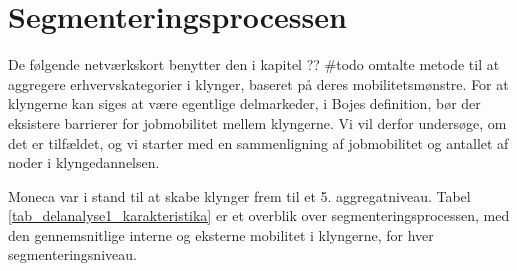 
%  
% 


\section{Segmenteringsprocessen \label{delanalyse1_segmenteringsprocessen}}

De følgende netværkskort benytter den i kapitel ?? \#todo omtalte metode til at aggregere erhvervskategorier i klynger, baseret på deres mobilitetsmønstre. For at klyngerne kan siges at være egentlige delmarkeder, i Bojes definition, bør der eksistere barrierer for jobmobilitet mellem klyngerne. Vi vil derfor undersøge, om det er tilfældet, og vi starter med en sammenligning af jobmobilitet og antallet af noder i klyngedannelsen. 

Moneca var i stand til at skabe klynger frem til et 5. aggregatniveau. Tabel \ref{tab_delanalyse1_karakteristika}  er et overblik over segmenteringsprocessen, med den gennemsnitlige interne og eksterne mobilitet i klyngerne, for hver segmenteringsniveau.

% 
\begin{table}[H] \centering
\caption{Karakteristika for segmenteringsprocessen}
\label{tab_delanalyse1_karakteristika}
\end{table}
%

